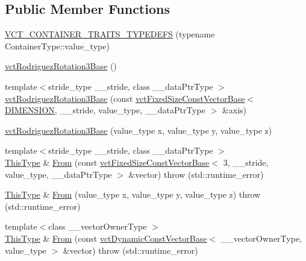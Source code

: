 \subsection*{Public Member Functions}
\begin{DoxyCompactItemize}
\item 
\hyperlink{classvct_rodriguez_rotation3_base_aee9fda6d51e757dafc3f8d5040aa21a7}{V\+C\+T\+\_\+\+C\+O\+N\+T\+A\+I\+N\+E\+R\+\_\+\+T\+R\+A\+I\+T\+S\+\_\+\+T\+Y\+P\+E\+D\+E\+F\+S} (typename Container\+Type\+::value\+\_\+type)
\item 
\hyperlink{classvct_rodriguez_rotation3_base_ae3fd3c80088abb2f03c5306ef895ad31}{vct\+Rodriguez\+Rotation3\+Base} ()
\item 
{\footnotesize template$<$stride\+\_\+type \+\_\+\+\_\+stride, class \+\_\+\+\_\+data\+Ptr\+Type $>$ }\\\hyperlink{classvct_rodriguez_rotation3_base_a900b5652df5978faf2f7052a99a22b4f}{vct\+Rodriguez\+Rotation3\+Base} (const \hyperlink{classvct_fixed_size_const_vector_base}{vct\+Fixed\+Size\+Const\+Vector\+Base}$<$ \hyperlink{classvct_rodriguez_rotation3_base_a37ad88df67e2e291c207a9d2892148c1a251299ef32f4c700fad09c8639bcce3a}{D\+I\+M\+E\+N\+S\+I\+O\+N}, \+\_\+\+\_\+stride, value\+\_\+type, \+\_\+\+\_\+data\+Ptr\+Type $>$ \&axis)
\item 
\hyperlink{classvct_rodriguez_rotation3_base_af09eda928d2d32adb1b81e48d85f2c91}{vct\+Rodriguez\+Rotation3\+Base} (value\+\_\+type x, value\+\_\+type y, value\+\_\+type z)
\item 
{\footnotesize template$<$stride\+\_\+type \+\_\+\+\_\+stride, class \+\_\+\+\_\+data\+Ptr\+Type $>$ }\\\hyperlink{classvct_rodriguez_rotation3_base_add2bccab7f6e86c98b3f97fd00b06dcc}{This\+Type} \& \hyperlink{classvct_rodriguez_rotation3_base_aff389cf931841e2766d345425de672ea}{From} (const \hyperlink{classvct_fixed_size_const_vector_base}{vct\+Fixed\+Size\+Const\+Vector\+Base}$<$ 3, \+\_\+\+\_\+stride, value\+\_\+type, \+\_\+\+\_\+data\+Ptr\+Type $>$ \&vector)  throw (std\+::runtime\+\_\+error)
\item 
\hyperlink{classvct_rodriguez_rotation3_base_add2bccab7f6e86c98b3f97fd00b06dcc}{This\+Type} \& \hyperlink{classvct_rodriguez_rotation3_base_aeaff60fbe583c21471677e67f90c1dc1}{From} (value\+\_\+type x, value\+\_\+type y, value\+\_\+type z)  throw (std\+::runtime\+\_\+error)
\item 
{\footnotesize template$<$class \+\_\+\+\_\+vector\+Owner\+Type $>$ }\\\hyperlink{classvct_rodriguez_rotation3_base_add2bccab7f6e86c98b3f97fd00b06dcc}{This\+Type} \& \hyperlink{classvct_rodriguez_rotation3_base_af2f94d3217ca58f127175b6e0209c24c}{From} (const \hyperlink{classvct_dynamic_const_vector_base}{vct\+Dynamic\+Const\+Vector\+Base}$<$ \+\_\+\+\_\+vector\+Owner\+Type, value\+\_\+type $>$ \&vector)  throw (std\+::runtime\+\_\+error)

\end{DoxyCompactItemize}

